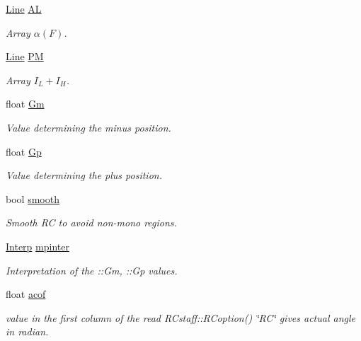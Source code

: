 \begin{DoxyCompactItemize}
\item 
\hyperlink{group__Types_ga4ce3fdeba27702c8b09a141e22709e38}{Line} \hyperlink{classEDEIprocess_a27cf3442a11ba3d9e9ca9f4137f61265}{AL}
\begin{DoxyCompactList}\small\item\em Array $\alpha(F)$. \item\end{DoxyCompactList}\item 
\hyperlink{group__Types_ga4ce3fdeba27702c8b09a141e22709e38}{Line} \hyperlink{classEDEIprocess_a8ed9fc30cd4798e0a90aac2c20e621ec}{PM}
\begin{DoxyCompactList}\small\item\em Array $ I_L+I_H $. \item\end{DoxyCompactList}\item 
float \hyperlink{classEDEIprocess_a5f7a6ba365d7b383a2b6c12a344230a2}{Gm}
\begin{DoxyCompactList}\small\item\em Value determining the minus position. \item\end{DoxyCompactList}\item 
float \hyperlink{classEDEIprocess_aef4917e24c6b7a3af7b97a9b37c890b8}{Gp}
\begin{DoxyCompactList}\small\item\em Value determining the plus position. \item\end{DoxyCompactList}\item 
bool \hyperlink{classEDEIprocess_aba287078b716c76c2d2276cec54a4bd3}{smooth}
\begin{DoxyCompactList}\small\item\em Smooth RC to avoid non-\/mono regions. \item\end{DoxyCompactList}\item 
\hyperlink{classInterp}{Interp} \hyperlink{classEDEIprocess_a1de13d8e88dc94c8627098298bc87667}{mpinter}
\begin{DoxyCompactList}\small\item\em Interpretation of the ::Gm, ::Gp values. \item\end{DoxyCompactList}\item 
float \hyperlink{classEDEIprocess_a0ee7ea8bd15cc065be6bc4bb4a08c161}{acof}
\begin{DoxyCompactList}\small\item\em value in the first column of the read RCstaff::RCoption() \char`\"{}RC\char`\"{} gives actual angle in radian. \item\end{DoxyCompactList}\end{DoxyCompactItemize}
